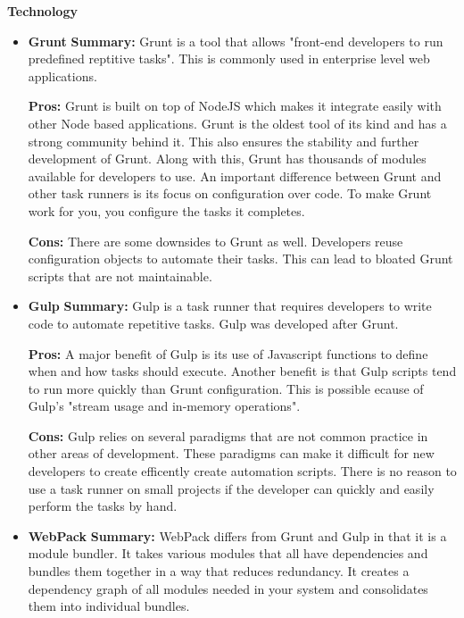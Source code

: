 \documentclass[draftclsnofoot,onecolumn,letterpaper,10pt]{IEEEtran}
\begin{document}
		\textbf{Technology}
			\begin{itemize}

				\item{\textbf{Grunt}}
					\textbf{Summary:}
						Grunt is a tool that allows "front-end developers to run predefined reptitive tasks"\cite{TaskRunners}. This is commonly used in enterprise level web applications.

					\textbf{Pros:}
						Grunt is built on top of NodeJS which makes it integrate easily with other Node based applications.
						Grunt is the oldest tool of its kind and has a strong community behind it.
						This also ensures the stability and further development of Grunt.
						Along with this, Grunt has thousands of modules available for developers to use.
						An important difference between Grunt and other task runners is its focus on configuration over code.
						To make Grunt work for you, you configure the tasks it completes.

					\textbf{Cons:}
						There are some downsides to Grunt as well.
						Developers reuse configuration objects to automate their tasks.
						This can lead to bloated Grunt scripts that are not maintainable\cite{TaskRunners}.


				\item{\textbf{Gulp}}
					\textbf{Summary:}
						Gulp is a task runner that requires developers to write code to automate repetitive tasks\cite{TaskRunners}.
						Gulp was developed after Grunt.

					\textbf{Pros:}
						A major benefit of Gulp is its use of Javascript functions to define when and how tasks should execute.
						Another benefit is that Gulp scripts tend to run more quickly than Grunt configuration\cite{GulpGruntSpeed}.
						This is possible ecause of Gulp's "stream usage and in-memory operations"\cite{TaskRunners}.

					\textbf{Cons:}
						Gulp relies on several paradigms that are not common practice in other areas of development.
						These paradigms can make it difficult for new developers to create efficently create automation scripts.
						There is no reason to use a task runner on small projects if the developer can quickly and easily perform the tasks by hand.


				\item{\textbf{WebPack}}
					\textbf{Summary:}
						WebPack differs from Grunt and Gulp in that it is a module bundler.
						It takes various modules that all have dependencies and bundles them together in a way that reduces redundancy\cite{WebPack}.
						It creates a dependency graph of all modules needed in your system and consolidates them into individual bundles\cite{WebPack}.


\end{itemize}
\end{document}
